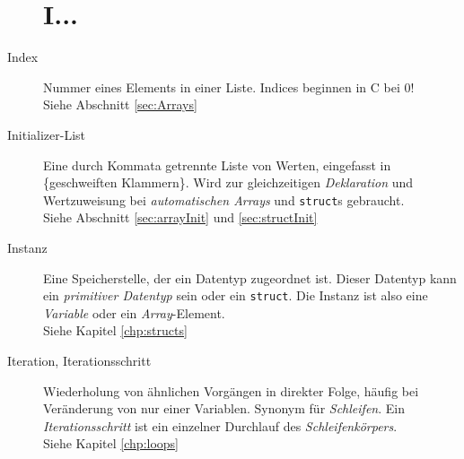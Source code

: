 \begin{appendices}
\begin{description}
\section*{I...}
\item[Index] Nummer eines Elements in einer Liste. Indices beginnen in C bei 0!\\
	Siehe Abschnitt \ref{sec:Arrays}
\item[Initializer-List] Eine durch Kommata getrennte Liste von Werten, eingefasst in \{geschweiften
	Klammern\}. Wird zur gleichzeitigen \emph{Deklaration} und Wertzuweisung bei \emph{automatischen
	Arrays} und \texttt{struct}s gebraucht.\\
	Siehe Abschnitt \ref{sec:arrayInit} und \ref{sec:structInit}
\item[Instanz] Eine Speicherstelle, der ein Datentyp zugeordnet ist. Dieser Datentyp kann ein
	\emph{primitiver Datentyp} sein oder ein \texttt{struct}. Die Instanz ist also eine
	\emph{Variable} oder ein \emph{Array}-Element.\\
	Siehe Kapitel \ref{chp:structs}
\item[Iteration, Iterationsschritt] Wiederholung von ähnlichen Vorgängen in direkter Folge, häufig bei
	Veränderung von nur einer Variablen. Synonym für  \emph{Schleifen}. Ein \emph{Iterationsschritt} ist
	ein einzelner Durchlauf des \emph{Schleifenkörpers}.\\
	Siehe Kapitel \ref{chp:loops}


\end{description}
\end{appendices}
